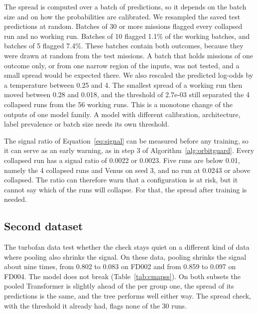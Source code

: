 The spread is computed over a batch of predictions, so it depends on the batch size and on how the probabilities are calibrated. We resampled the saved test predictions at random. Batches of 30 or more missions flagged every collapsed run and no working run. Batches of 10 flagged 1.1\% of the working batches, and batches of 5 flagged 7.4\%. These batches contain both outcomes, because they were drawn at random from the test missions. A batch that holds missions of one outcome only, or from one narrow region of the inputs, was not tested, and a small spread would be expected there. We also rescaled the predicted log-odds by a temperature between 0.25 and 4. The smallest spread of a working run then moved between 0.28 and 0.018, and the threshold of 2.7e-03 still separated the 4 collapsed runs from the 56 working runs. This is a monotone change of the outputs of one model family. A model with different calibration, architecture, label prevalence or batch size needs its own threshold.

The signal ratio of Equation~\ref{eq:signal} can be measured before any training, so it can serve as an early warning, as in step 3 of Algorithm~\ref{alg:orbitguard}. Every collapsed run has a signal ratio of 0.0022 or 0.0023. Five runs are below 0.01, namely the 4 collapsed runs and Venus on seed 3, and no run at 0.0243 or above collapsed. The ratio can therefore warn that a configuration is at risk, but it cannot say which of the runs will collapse. For that, the spread after training is needed.

\subsection{Second dataset}
\label{sec:second}

The turbofan data test whether the check stays quiet on a different kind of data where pooling also shrinks the signal. On these data, pooling shrinks the signal about nine times, from 0.802 to 0.083 on FD002 and from 0.859 to 0.097 on FD004. The model does not break (Table~\ref{tab:cmapss}). On both subsets the pooled Transformer is slightly ahead of the per group one, the spread of its predictions is the same, and the tree performs well either way. The spread check, with the threshold it already had, flags none of the 30 runs.



